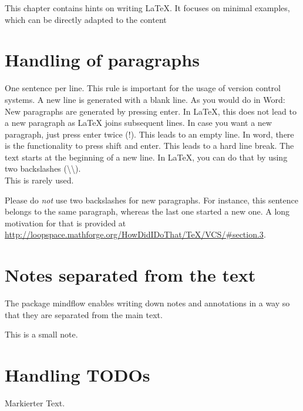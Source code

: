 \documentclass[
  fontsize=10pt
  numbers=noenddot,
  english,  %
  paper=a5,
  twoside,  %
  DIV=calc,
  headings=small,
  bibliography=totoc,
  listof=totoc,
  draft=false
]{scrbook}
\theoremstyle{break}
\newcommand{\textmarker}[1]{{\color{red} #1}\xspace}
\begin{document}
This chapter contains hints on writing LaTeX.
It focuses on minimal examples, which can be directly adapted to the content

\section{Handling of paragraphs}

\begin{ltgexample}
One sentence per line.
This rule is important for the usage of version control systems.
A new line is generated with a blank line.
As you would do in Word:
New paragraphs are generated by pressing enter.
In LaTeX, this does not lead to a new paragraph as LaTeX joins subsequent lines.
In case you want a new paragraph, just press enter twice (!).
This leads to an empty line.
In word, there is the functionality to press shift and enter.
This leads to a hard line break.
The text starts at the beginning of a new line.
In LaTeX, you can do that by using two backslashes (\textbackslash\textbackslash).\\
This is rarely used.

Please do \textit{not} use two backslashes for new paragraphs.
For instance, this sentence belongs to the same paragraph, whereas the last one started a new one.
A long motivation for that is provided at \url{http://loopspace.mathforge.org/HowDidIDoThat/TeX/VCS/#section.3}.
\end{ltgexample}

\section{Notes separated from the text}

The package mindflow enables writing down notes and annotations in a way so that they are separated from the main text.

\begin{ltgexample}
\begin{mindflow}
This is a small note.
\end{mindflow}
\end{ltgexample}

\section{Handling TODOs}

\begin{ltgexample}
\textmarker{Markierter Text.}
\end{ltgexample}
\end{document}
